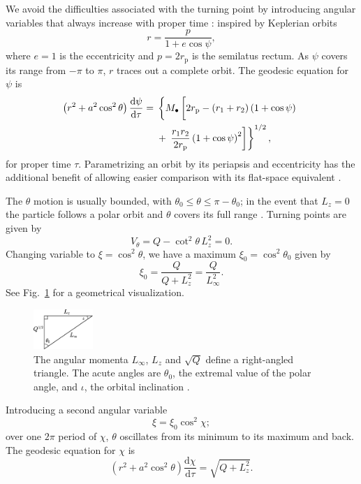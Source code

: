 \documentclass[useAMS,usedcolumn,usegraphicx,usenatbib]{mn2e}
\newcommand{\figref}[1]{Fig.~\ref{fig:#1}}
\newcommand{\sub}[1]{\ensuremath{_\mathrm{#1}}}
\newcommand{\dd}{\ensuremath{\mathrm{d}}}
\newcommand{\diff}[2]{\ensuremath{\frac{\dd {#1}}{\dd {#2}}}}
\begin{document}
We avoid the difficulties associated with the turning point by introducing angular variables that always increase with proper time \citep{Drasco2004}: inspired by Keplerian orbits
\begin{equation}
r = \frac{p}{1+e\cos\psi},
\end{equation}
where $e = 1$ is the eccentricity and $p = 2r\sub{p}$ is the semilatus rectum. As $\psi$ covers its range from $-\pi$ to $\pi$, $r$ traces out a complete orbit. The geodesic equation for $\psi$ is
\begin{align}
\left(r^2 + a^2\cos^2\theta\right)\diff{\psi}{\tau} = {} & \left\{M_\bullet\left[2r\sub{p} - \left(r_1 + r_2\right)\left(1 + \cos\psi\right) \vphantom{\frac{r_1 r_2}{2r\sub{p}}} \right.\right. \nonumber \\*
 {} & + \left.\left. \frac{r_1 r_2}{2r\sub{p}}\left(1 + \cos\psi\right)^2\right]\right\}^{1/2},
\end{align}
for proper time $\tau$. Parametrizing an orbit by its periapsis and eccentricity has the additional benefit of allowing easier comparison with its flat-space equivalent \citep*{Gair2005}.

The $\theta$ motion is usually bounded, with $\theta_0 \leq \theta \leq \pi - \theta_0$; in the event that $L_z = 0$ the particle follows a polar orbit and $\theta$ covers its full range \citep{Wilkins1972}. Turning points are given by
\begin{equation}
V_\theta = Q - \cot^2\theta\, L_z^2 = 0.
\end{equation}
Changing variable to $\xi = \cos^2\theta$, we have a maximum $\xi_0 = \cos^2\theta_0$ given by
\begin{equation}
\xi_0 = \frac{Q}{Q+L_z^2} = \frac{Q}{L_\infty^2}.
\label{eq:theta_0}
\end{equation}
See \figref{L_triangle} for a geometrical visualization.
\begin{figure}
\begin{center}
\includegraphics[width=0.2\textwidth]{Triangle}
    \caption{The angular momenta $L_\infty$, $L_z$ and $\sqrt{Q}$ define a right-angled triangle. The acute angles are $\theta_0$, the extremal value of the polar angle, and $\iota$, the orbital inclination \citep*{Glampedakis2002}.}
   \label{fig:L_triangle}
\end{center}
\end{figure}
Introducing a second angular variable \citep{Drasco2004}
\begin{equation}
\xi = \xi_0\cos^2\chi;
\end{equation}
over one $2\pi$ period of $\chi$, $\theta$ oscillates from its minimum to its maximum and back. The geodesic equation for $\chi$ is
\begin{equation}
\left(r^2 + a^2\cos^2\theta\right)\diff{\chi}{\tau} = \sqrt{Q + L_z^2}.
\end{equation}
\end{document}
